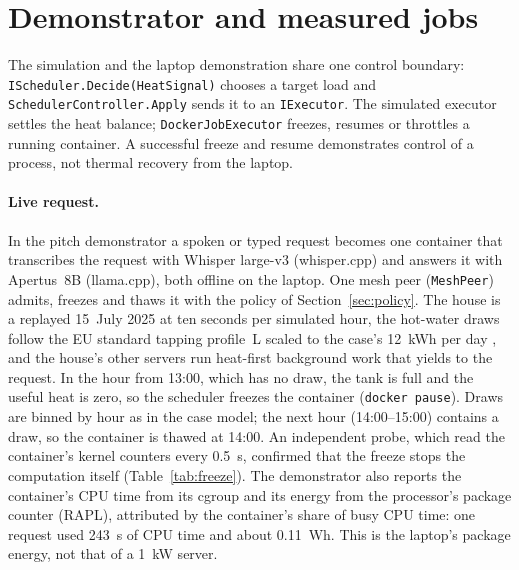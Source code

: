 \section{Demonstrator and measured jobs}
\label{sec:demonstrator}

The simulation and the laptop demonstration share one control boundary:
\texttt{IScheduler.Decide(HeatSignal)} chooses a target load and
\texttt{SchedulerController.Apply} sends it to an \texttt{IExecutor}. The simulated executor
settles the heat balance; \texttt{DockerJobExecutor} freezes, resumes or throttles a running
container. A successful freeze and resume demonstrates control of a process, not thermal recovery
from the laptop.

\paragraph{Live request.} In the pitch demonstrator a spoken or typed request becomes one container
that transcribes the request with Whisper large-v3 (whisper.cpp) and answers it with Apertus~8B
(llama.cpp), both offline on the laptop. One mesh peer (\texttt{MeshPeer}) admits, freezes and thaws
it with the policy of Section~\ref{sec:policy}. The house is a replayed 15~July 2025 at ten seconds per
simulated hour, the hot-water draws follow the EU standard tapping profile~L scaled to the case's
\qty{12}{kWh} per day \cite{eu814}, and the house's other servers run heat-first background work
that yields to the request. In the hour from 13:00, which has no draw, the tank is full and the
useful heat is zero, so the scheduler freezes the container (\texttt{docker pause}). Draws are
binned by hour as in the case model; the next hour (14:00--15:00) contains a draw, so the container
is thawed at 14:00. An independent probe, which read the
container's kernel counters every \qty{0.5}{s}, confirmed that the freeze stops the computation
itself (Table~\ref{tab:freeze}). The demonstrator also reports the container's CPU time from its
cgroup and its energy from the processor's package counter (RAPL), attributed by the container's
share of busy CPU time: one request used \qty{243}{s} of CPU time and about \qty{0.11}{Wh}. This is
the laptop's package energy, not that of a \qty{1}{kW} server.

